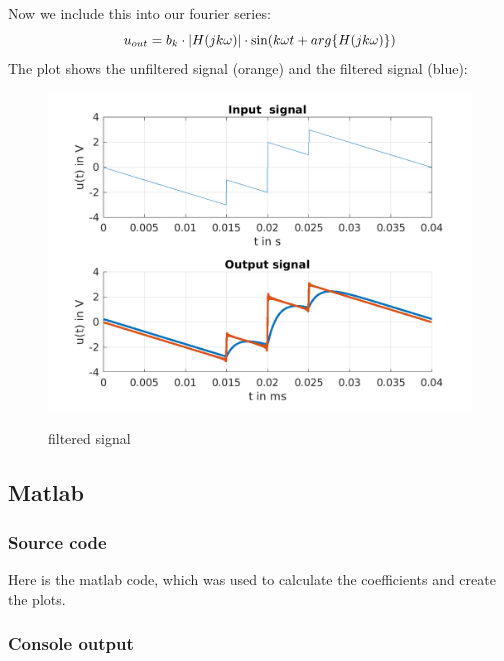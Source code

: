 \documentclass[a4paper]{article}
\begin{document}
Now we include this into our fourier series:
\begin{equation*}
	u_{out} = b_k \cdot |H(jk\omega)| \cdot \sin(k\omega t + arg\{H(jk\omega)\})\\
\end{equation*}
The plot shows the unfiltered signal (orange) and the filtered signal (blue):
\begin{figure}[h!]
	\includegraphics{"./Figures/output_signal.png"} \centering
	\label{fig:filterSig}
	\caption{filtered signal}
  \end{figure}

\subsection{Matlab}
\subsubsection{Source code}
Here is the matlab code, which was used to calculate the coefficients and create the plots.

\subsubsection{Console output}

\end{document}
